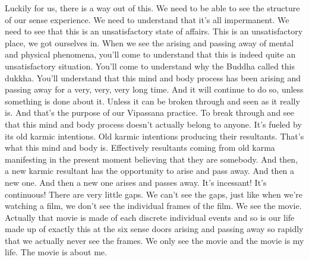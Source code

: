 \documentclass[letterpaper,10pt,english]{sphinxmanual}
\begin{document}
\sphinxAtStartPar
Luckily for us, there is a way out of this. We need to be able to see the
structure of our sense experience. We need to understand that it’s all impermanent. We need to see that this is an unsatisfactory state of affairs. This is
an unsatisfactory place, we got ourselves in. When we see the arising and
passing away of mental and physical phenomena, you’ll come to understand
that this is indeed quite an unsatisfactory situation. You’ll come to understand why the Buddha called this dukkha. You’ll understand that this mind
and body process has been arising and passing away for a very, very, very
long time. And it will continue to do so, unless something is done about it.
Unless it can be broken through and seen as it really is. And that’s the purpose of our Vipassana practice. To break through and see that this mind and
  body process doesn’t actually belong to anyone. It’s fueled by its old karmic
intentions. Old karmic intentions producing their resultants. That’s what this
mind and body is. Effectively resultants coming from old karma manifesting
in the present moment believing that they are somebody. And then, a new
karmic resultant has the opportunity to arise and pass away. And then a new
one. And then a new one arises and passes away. It’s incessant! It’s continuous! There are very little gaps.
We can’t see the gaps, just like when we’re
watching a film, we don’t see the individual frames of the film. We see the
movie. Actually that movie is made of each discrete individual events and so
is our life made up of exactly this at the six sense doors arising and passing
away so rapidly that we actually never see the frames. We only see the movie
and the movie is my life. The movie is about me.
\end{document}
